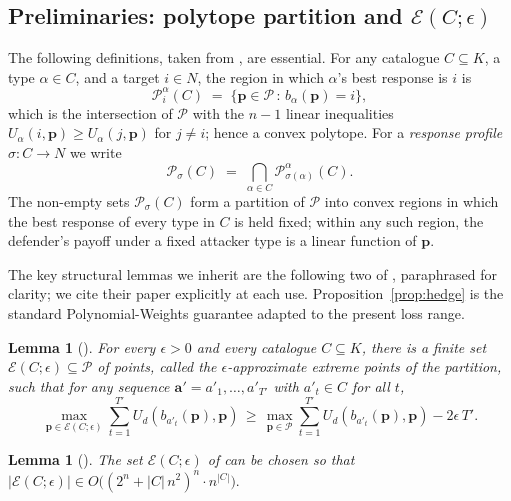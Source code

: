 \documentclass[letterpaper,9pt,twocolumn]{extarticle}
\newcommand{\pvec}{\mathbf{p}}
\newcommand{\avec}{\mathbf{a}}
\newcommand{\cP}{\mathcal{P}}
\newcommand{\cE}{\mathcal{E}}
\theoremstyle{plain}
\newtheorem{lemma}[theorem]{Lemma}
\theoremstyle{definition}
\theoremstyle{remark}
\begin{document}
\subsection{Preliminaries: polytope partition and $\cE(C;\epsilon)$}
\label{sec:polytopes}

The following definitions, taken from \citet[\S 4]{balcan2015}, are
essential. For any catalogue $C\subseteq K$, a type $\alpha\in C$, and a
target $i\in N$, the region in which $\alpha$'s best response is $i$ is
\begin{equation}
\cP^\alpha_i(C)\;=\;\{\pvec\in\cP\,:\,b_\alpha(\pvec)=i\},
\label{eq:Pia}
\end{equation}
which is the intersection of $\cP$ with the $n-1$ linear inequalities
$U_\alpha(i,\pvec)\ge U_\alpha(j,\pvec)$ for $j\ne i$; hence a convex
polytope. For a \emph{response profile}
$\sigma:C\to N$ we write
\begin{equation}
\cP_\sigma(C)\;=\;\bigcap_{\alpha\in C}\cP^\alpha_{\sigma(\alpha)}(C).
\label{eq:Psigma}
\end{equation}
The non-empty sets $\cP_\sigma(C)$ form a partition of $\cP$ into convex
regions in which the best response of every type in $C$ is held fixed;
within any such region, the defender's payoff under a fixed attacker type
is a linear function of $\pvec$.

The key structural lemmas we inherit are the following two of
\citet{balcan2015}, paraphrased for clarity; we cite their paper
explicitly at each use. Proposition~\ref{prop:hedge} is the standard
Polynomial-Weights guarantee adapted to the present loss range.

\begin{lemma}[{\citealp[Lemma 4.3]{balcan2015}}]
\label{lem:43}
For every $\epsilon>0$ and every catalogue $C\subseteq K$, there is a
finite set $\cE(C;\epsilon)\subseteq \cP$ of points, called the
$\epsilon$-approximate extreme points of the partition, such that for any
sequence $\avec'=a'_1,\dots,a'_{T'}$ with $a'_t\in C$ for all $t$,
\[
\max_{\pvec\in\cE(C;\epsilon)}\!\sum_{t=1}^{T'}\!U_d(b_{a'_t}(\pvec),\pvec)\,\ge\,\max_{\pvec\in\cP}\!\sum_{t=1}^{T'}\!U_d(b_{a'_t}(\pvec),\pvec)-2\epsilon\,T'.
\]
\end{lemma}

\begin{lemma}[{\citealp[Lemma 4.4]{balcan2015}}]
\label{lem:44}
The set $\cE(C;\epsilon)$ of  can be chosen so that
\(|\cE(C;\epsilon)|\in O\!\bigl((2^n+|C|\,n^2)^n\cdot n^{|C|}\bigr).\)
\end{lemma}
\end{document}
